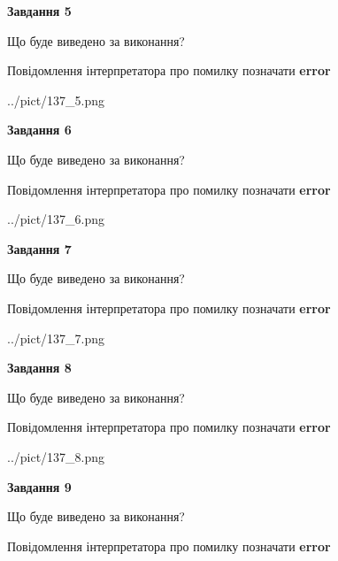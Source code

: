 \documentclass[11pt, ukrainian]{article}
\begin{document}
{\begin {large}
{\begin {center}\textbf{Завдання 5}\end {center}}\par
Що буде виведено за виконання? \par
Повідомлення інтерпретатора про помилку позначати \textbf{error}

\begin{center}
	{../pict/137_5.png}
\end{center}
\newpage

{\begin {center}\textbf{Завдання 6}\end {center}}\par
Що буде виведено за виконання? \par
Повідомлення інтерпретатора про помилку позначати \textbf{error}

\begin{center}
	{../pict/137_6.png}
\end{center}
\newpage

{\begin {center}\textbf{Завдання 7}\end {center}}\par
Що буде виведено за виконання? \par
Повідомлення інтерпретатора про помилку позначати \textbf{error}

\begin{center}
	{../pict/137_7.png}
\end{center}
\newpage

{\begin {center}\textbf{Завдання 8}\end {center}}\par
Що буде виведено за виконання? \par
Повідомлення інтерпретатора про помилку позначати \textbf{error}

\begin{center}
	{../pict/137_8.png}
\end{center}
\newpage

{\begin {center}\textbf{Завдання 9}\end {center}}\par
Що буде виведено за виконання? \par
Повідомлення інтерпретатора про помилку позначати \textbf{error}


\end{large}}
\end{document}
